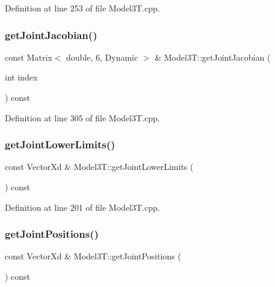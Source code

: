 Definition at line 253 of file Model3\+T.\+cpp.

\hypertarget{classModel3T_a6fd62404b6e74f239142c6a4de76d7e9}{}\label{classModel3T_a6fd62404b6e74f239142c6a4de76d7e9} 
\subsubsection{\texorpdfstring{get\+Joint\+Jacobian()}{getJointJacobian()}}
{\footnotesize\ttfamily const Matrix$<$ double, 6, Dynamic $>$ \& Model3\+T\+::get\+Joint\+Jacobian (\begin{DoxyParamCaption}\item[{int}]{index }\end{DoxyParamCaption}) const\hspace{0.3cm}{\ttfamily [virtual]}}



Definition at line 305 of file Model3\+T.\+cpp.

\hypertarget{classModel3T_aea8da0b07db1efd0a8f578f0afad2372}{}\label{classModel3T_aea8da0b07db1efd0a8f578f0afad2372} 
\subsubsection{\texorpdfstring{get\+Joint\+Lower\+Limits()}{getJointLowerLimits()}}
{\footnotesize\ttfamily const Vector\+Xd \& Model3\+T\+::get\+Joint\+Lower\+Limits (\begin{DoxyParamCaption}{ }\end{DoxyParamCaption}) const\hspace{0.3cm}{\ttfamily [virtual]}}



Definition at line 201 of file Model3\+T.\+cpp.

\hypertarget{classModel3T_abcaa7a21ab72837d469e5b13db23f0bc}{}\label{classModel3T_abcaa7a21ab72837d469e5b13db23f0bc} 
\subsubsection{\texorpdfstring{get\+Joint\+Positions()}{getJointPositions()}}
{\footnotesize\ttfamily const Vector\+Xd \& Model3\+T\+::get\+Joint\+Positions (\begin{DoxyParamCaption}{ }\end{DoxyParamCaption}) const\hspace{0.3cm}{\ttfamily [virtual]}}



